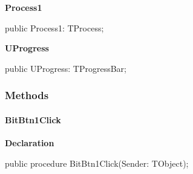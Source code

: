 \documentclass{report}
\newif\ifpdf
\begin{document}
\begin{list}{}
\par  \label{uninstall.TRMForm-Process1}
\item[\textbf{Process1}\hfill]
\ifpdf
\begin{flushleft}
\fi
\begin{ttfamily}
public Process1: TProcess;\end{ttfamily}

\ifpdf
\end{flushleft}
\fi


\par  \label{uninstall.TRMForm-UProgress}
\item[\textbf{UProgress}\hfill]
\ifpdf
\begin{flushleft}
\fi
\begin{ttfamily}
public UProgress: TProgressBar;\end{ttfamily}

\ifpdf
\end{flushleft}
\fi


\par  \end{list}
\subsubsection*{\large{\textbf{Methods}}\normalsize\hspace{1ex}\hfill}
\paragraph*{BitBtn1Click}\hspace*{\fill}

\label{uninstall.TRMForm-BitBtn1Click}
\begin{list}{}{
\setlength{\itemindent}{0cm}
\setlength{\listparindent}{0cm}
\setlength{\leftmargin}{\evensidemargin}
\addtolength{\leftmargin}{\tmplength}
\settowidth{\labelsep}{X}
\addtolength{\leftmargin}{\labelsep}
\setlength{\labelwidth}{\tmplength}
}
\item[\textbf{Declaration}\hfill]
\ifpdf
\begin{flushleft}
\fi
\begin{ttfamily}
public procedure BitBtn1Click(Sender: TObject);\end{ttfamily}

\ifpdf
\end{flushleft}
\fi

\end{list}
\end{document}
